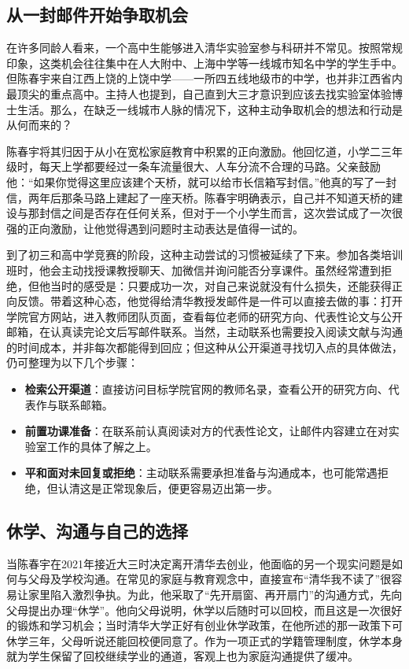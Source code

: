 \documentclass[UTF8,a4paper,11pt,fontset=fandol]{ctexart}
\begin{document}
\subsection{从一封邮件开始争取机会}
在许多同龄人看来，一个高中生能够进入清华实验室参与科研并不常见。按照常规印象，这类机会往往集中在人大附中、上海中学等一线城市知名中学的学生手中。但陈春宇来自江西上饶的上饶中学——一所四五线地级市的中学，也并非江西省内最顶尖的重点高中。主持人也提到，自己直到大三才意识到应该去找实验室体验博士生活。那么，在缺乏一线城市人脉的情况下，这种主动争取机会的想法和行动是从何而来的？

陈春宇将其归因于从小在宽松家庭教育中积累的正向激励。他回忆道，小学二三年级时，每天上学都要经过一条车流量很大、人车分流不合理的马路。父亲鼓励他：“如果你觉得这里应该建个天桥，就可以给市长信箱写封信。”他真的写了一封信，两年后那条马路上建起了一座天桥。陈春宇明确表示，自己并不知道天桥的建设与那封信之间是否存在任何关系，但对于一个小学生而言，这次尝试成了一次很强的正向激励，让他觉得遇到问题时主动表达是值得一试的。

到了初三和高中学竞赛的阶段，这种主动尝试的习惯被延续了下来。参加各类培训班时，他会主动找授课教授聊天、加微信并询问能否分享课件。虽然经常遭到拒绝，但他当时的感受是：只要成功一次，对自己来说就没有什么损失，还能获得正向反馈。带着这种心态，他觉得给清华教授发邮件是一件可以直接去做的事：打开学院官方网站，进入教师团队页面，查看每位老师的研究方向、代表性论文与公开邮箱，在认真读完论文后写邮件联系。当然，主动联系也需要投入阅读文献与沟通的时间成本，并非每次都能得到回应；但这种从公开渠道寻找切入点的具体做法，仍可整理为以下几个步骤：
\begin{itemize}
\item \textbf{检索公开渠道}：直接访问目标学院官网的教师名录，查看公开的研究方向、代表作与联系邮箱。
\item \textbf{前置功课准备}：在联系前认真阅读对方的代表性论文，让邮件内容建立在对实验室工作的具体了解之上。
\item \textbf{平和面对未回复或拒绝}：主动联系需要承担准备与沟通成本，也可能常遇拒绝，但认清这是正常现象后，便更容易迈出第一步。
\end{itemize}

\subsection{休学、沟通与自己的选择}
当陈春宇在2021年接近大三时决定离开清华去创业，他面临的另一个现实问题是如何与父母及学校沟通。在常见的家庭与教育观念中，直接宣布“清华我不读了”很容易让家里陷入激烈争执。为此，他采取了“先开扇窗、再开扇门”的沟通方式，先向父母提出办理“休学”。他向父母说明，休学以后随时可以回校，而且这是一次很好的锻炼和学习机会；当时清华大学正好有创业休学政策，在他所述的那一政策下可休学三年，父母听说还能回校便同意了。作为一项正式的学籍管理制度，休学本身就为学生保留了回校继续学业的通道，客观上也为家庭沟通提供了缓冲。
\end{document}
